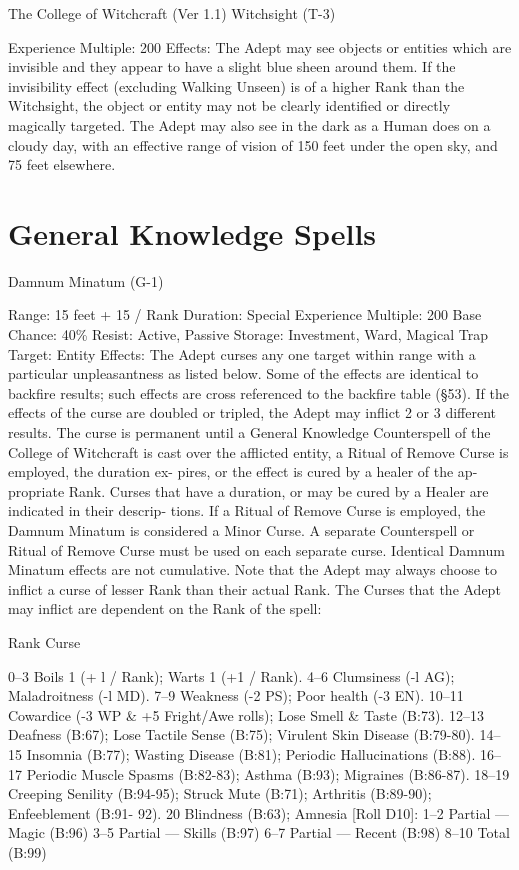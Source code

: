 \begin{Chapter}{The College of Witchcraft (Ver 1.1)}
Witchsight (T-3) 

Experience Multiple: 200 
Effects:  The  Adept  may  see  objects  or  entities 
which are invisible and they appear to have a slight 
blue  sheen  around  them.  If  the  invisibility  effect 
(excluding  Walking  Unseen)  is  of  a  higher  Rank 
than the Witchsight, the object or entity may not be 
clearly  identified  or  directly  magically  targeted. 
The  Adept  may  also  see  in  the  dark  as  a  Human 
does  on  a  cloudy  day,  with  an  effective  range  of 
vision of 150 feet under the open sky, and 75 feet 
elsewhere. 


\section{General Knowledge Spells}

Damnum Minatum (G-1) 

Range: 15 feet + 15 / Rank 
Duration: Special 
Experience Multiple: 200 
Base Chance: 40\% 
Resist: Active, Passive 
Storage: Investment, Ward, Magical Trap 
Target: Entity 
Effects:  The  Adept  curses  any  one  target  within 
range  with  a  particular  unpleasantness  as  listed 
below. Some of the effects are identical to backfire 
results;  such  effects  are  cross  referenced  to  the 
backfire  table  (§53).  If  the  effects  of  the  curse  are 
doubled  or  tripled,  the  Adept  may  inflict  2  or  3 
different  results.  The  curse  is  permanent  until  a 
General Knowledge Counterspell of the College of 
Witchcraft is cast over the afflicted entity, a Ritual 
of  Remove  Curse  is  employed,  the  duration  ex-
pires,  or  the  effect  is  cured  by  a  healer  of  the  ap-
propriate Rank. Curses that have a duration, or may 
be cured by a Healer are indicated in their descrip-
tions. If a Ritual of Remove Curse is employed, the 
Damnum Minatum is considered a Minor Curse. A 
separate  Counterspell  or  Ritual  of  Remove  Curse 
must  be  used  on  each  separate  curse.  Identical 
Damnum  Minatum  effects  are  not  cumulative. 
Note that the Adept may always choose to inflict a 
curse  of  lesser  Rank  than  their  actual  Rank.  The 
Curses that the Adept may inflict are dependent on 
the Rank of the spell: 

Rank Curse 

0–3 Boils 1 (+ l / Rank); Warts 1 (+1 / Rank). 
4–6 Clumsiness (-l AG); Maladroitness (-l MD). 
7–9 Weakness (-2 PS); Poor health (-3 EN). 
10–11 Cowardice (-3 WP \& +5 Fright/Awe rolls); 
Lose Smell \& Taste (B:73). 
12–13 Deafness (B:67); Lose Tactile Sense (B:75); 
Virulent Skin Disease (B:79-80). 
14–15 Insomnia (B:77); Wasting Disease (B:81); 
Periodic Hallucinations (B:88). 
16–17 Periodic Muscle Spasms (B:82-83); Asthma 
(B:93); Migraines (B:86-87). 
18–19 Creeping Senility (B:94-95); Struck Mute 
(B:71); Arthritis (B:89-90); Enfeeblement (B:91-
92). 
20 Blindness (B:63); 
Amnesia [Roll D10]: 
 1–2 Partial — Magic (B:96) 
 3–5 Partial — Skills (B:97) 
 6–7 Partial — Recent (B:98) 
 8–10 Total (B:99) 


\end{Chapter}
